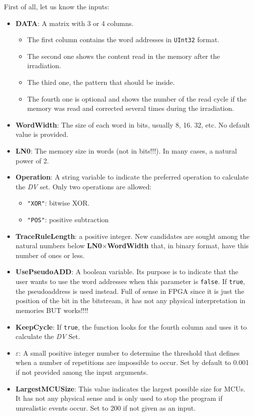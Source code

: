\begin{itemize}
 	First of all, let us know the inputs:
 	\begin{itemize}
 		
 		\item   \textbf{DATA}: A matrix with 3 or 4 columns. 
 		\begin{itemize}
 			\item The first column contains the word addresses in \texttt{UInt32} format.
 			\item The second one shows the content read in the memory after the irradiation.
 			\item The third one, the pattern that should be inside.
 			\item  The fourth one is optional and shows the number of the read cycle if the   memory was read and corrected several times during the irradiation.
 		\end{itemize}
 		\item   \textbf{WordWidth}: The size of each word in bits, usually 8, 16. 32, etc. No default value is provided.
 		\item   \textbf{LN0}: The memory size in words (not in bits!!!). In many cases, a natural power of 2.
 		\item   \textbf{Operation}: A string variable to indicate the preferred operation to calculate
 		the \textit{DV} set. Only two operations are allowed: 
 		\begin{itemize}
 			\item \texttt{"XOR"}: bitwise XOR.
 			\item\texttt{"POS"}: positive subtraction
 		\end{itemize}
 		\item \textbf{TraceRuleLength}: a positive integer. New candidates are sought among the natural numbers below \textbf{LN0}\(\times\)\textbf{WordWidth} that, in binary format, have this number of ones or less.
 		\item  \textbf{UsePseudoADD}: A boolean variable. Its purpose is to indicate that the user wants to use the word addresses when this parameter is \texttt{false}. If \texttt{true}, the pseudoaddress is used instead. Full of sense in FPGA since it is just the position  of the bit in the bitstream, it has not any physical interpretation in memories BUT works!!!!
 		\item   \textbf{KeepCycle}: If \texttt{true}, the function looks for the fourth column and uses it to calculate the \textit{DV} Set.
 		\item   \textbf{\(\varepsilon\)}: A small positive integer number to determine the threshold that defines when a number of repetitions are impossible to occur. Set by default to 0.001 if not provided among the input arguments.
 		\item  \textbf{LargestMCUSize}: This value indicates the largest possible size for MCUs. It has not any physical sense  and is only used to stop the program if unrealistic events occur. Set to 200 if not given as an input.
 		

\end{itemize}
\end{itemize}
